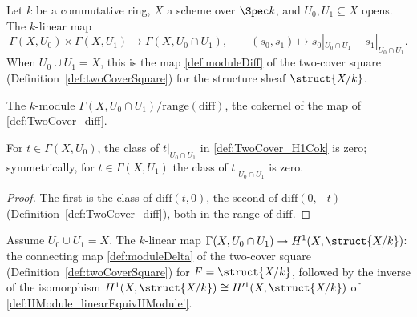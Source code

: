 \begin{definition}
  \label{def:TwoCover_diff}
  \leanok
  Let \(k\) be a commutative ring, \(X\) a scheme over \(\Spec k\), and \(U_0, U_1 \subseteq X\)
  opens. The \(k\)-linear map
  \[
    \Gamma(X,U_0) \times \Gamma(X,U_1) \longrightarrow \Gamma(X, U_0 \cap U_1), \qquad
    (s_0,s_1) \longmapsto s_0|_{U_0 \cap U_1} - s_1|_{U_0 \cap U_1} .
  \]
  When \(U_0 \cup U_1 = X\), this is the map \ref{def:moduleDiff} of the two-cover square
  (Definition~\ref{def:twoCoverSquare}) for the structure sheaf \(\struct{X/k}\).
\end{definition}

\begin{definition}
  \label{def:TwoCover_H1Cok}
  \leanok
  The \(k\)-module \(\Gamma(X, U_0 \cap U_1)/\mathrm{range}(\mathrm{diff})\), the cokernel of
  the map of \ref{def:TwoCover_diff}.
\end{definition}

\begin{lemma}
  \label{lem:TwoCover_h1Cok_mk_res}
  \leanok
  For \(t \in \Gamma(X,U_0)\), the class of \(t|_{U_0 \cap U_1}\) in
  \ref{def:TwoCover_H1Cok} is zero; symmetrically, for \(t \in \Gamma(X,U_1)\) the class of
  \(t|_{U_0 \cap U_1}\) is zero.
\end{lemma}
\begin{proof}
  \leanok
  The first is the class of \(\mathrm{diff}(t,0)\), the second of \(\mathrm{diff}(0,-t)\)
  (Definition~\ref{def:TwoCover_diff}), both in the range of \(\mathrm{diff}\).
\end{proof}

\begin{definition}
  \label{def:TwoCover_delta}
  \leanok
  Assume \(U_0 \cup U_1 = X\). The \(k\)-linear map
  \(\Gamma(X, U_0 \cap U_1) \to H^1(X, \struct{X/k})\): the connecting map
  \ref{def:moduleDelta} of the two-cover square (Definition~\ref{def:twoCoverSquare}) for
  \(F = \struct{X/k}\), followed by the inverse of the isomorphism
  \(H^1(X,\struct{X/k}) \cong H'^1(X,\struct{X/k})\) of
  \ref{def:HModule_linearEquivHModule'}.
\end{definition}

